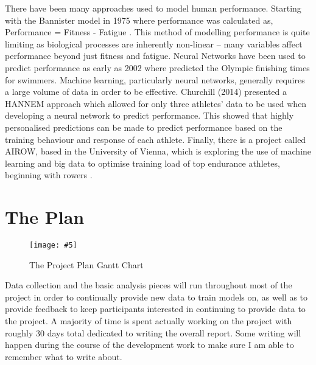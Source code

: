 \documentclass[a4paper]{article}
\newcommand{\includescalefigure}[5]{
\begin{figure}[!ht]
\centering
\texttt{[image: \#5]}
\captionsetup{width=.8\linewidth} 
\caption[#2]{#3}
\label{#1}
\end{figure}
}
\begin{document}
There have been many approaches used to model human performance. Starting with the Bannister model in 1975 where performance was calculated as, Performance = Fitness - Fatigue \autocite{Bannister1976}. This method of modelling performance is quite limiting as biological processes are inherently non-linear -- many variables affect performance beyond just fitness and fatigue. Neural Networks have been used to predict performance as early as 2002 where \textcite{Edelmannnusser2002} predicted the Olympic finishing times for swimmers. Machine learning, particularly neural networks, generally requires a large volume of data in order to be effective. Churchill (2014) \autocite{Churchill2014} presented a HANNEM approach which allowed for only three athletes' data to be used when developing a neural network to predict performance. This showed that highly personalised predictions can be made to predict performance based on the training behaviour and response of each athlete. Finally, there is a project called AIROW, based in the University of Vienna, which is exploring the use of machine learning and big data to optimise training load of top endurance athletes, beginning with rowers \autocite{AIROW}.

\section{The Plan}
{
\includescalefigure{fig:the_plan}{The Plan}{The Project Plan Gantt Chart}{0.9}{project_plan.png}
}
Data collection and the basic analysis pieces will run throughout most of the project in order to continually provide new data to train models on, as well as to provide feedback to keep participants interested in continuing to provide data to the project. A majority of time is spent actually working on the project with roughly 30 days total dedicated to writing the overall report. Some writing will happen during the course of the development work to make sure I am able to remember what to write about.
\end{document}
